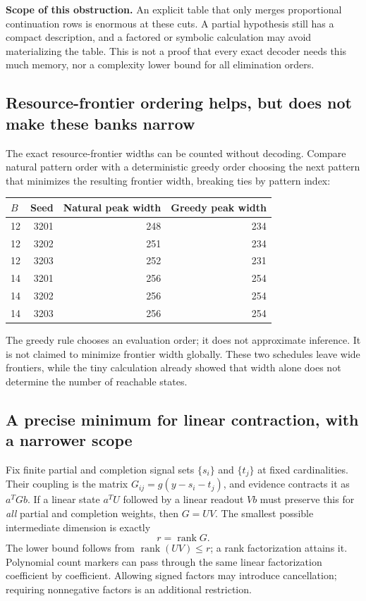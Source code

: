 \documentclass[10pt,a4paper]{article}
\begin{document}
\textbf{Scope of this obstruction.} An explicit table that only merges proportional continuation rows is enormous
at these cuts. A partial hypothesis still has a compact description, and a factored or symbolic calculation may
avoid materializing the table. This is not a proof that every exact decoder needs this much memory, nor a
complexity lower bound for all elimination orders.

\clearpage
\subsection{Resource-frontier ordering helps, but does not make these banks narrow}
The exact resource-frontier widths can be counted without decoding.
Compare natural pattern order with a deterministic greedy order choosing the next pattern that minimizes
the resulting frontier width, breaking ties by pattern index:
\begin{center}
\begin{tabular}{@{}lrrr@{}}\toprule
$B$ & Seed & Natural peak width & Greedy peak width\\\midrule
12 & 3201 & 248 & 234\\
12 & 3202 & 251 & 234\\
12 & 3203 & 252 & 231\\
14 & 3201 & 256 & 254\\
14 & 3202 & 256 & 254\\
14 & 3203 & 256 & 254\\\bottomrule
\end{tabular}
\end{center}
The greedy rule chooses an evaluation order; it does not approximate inference.
It is not claimed to minimize frontier width globally. These two schedules leave wide frontiers, while the
tiny calculation already showed that width alone does not determine the number of reachable states.

\subsection{A precise minimum for linear contraction, with a narrower scope}
Fix finite partial and completion signal sets $\{s_i\}$ and $\{t_j\}$ at fixed cardinalities. Their coupling is
the matrix $G_{ij}=g(y-s_i-t_j)$, and evidence contracts it as $a^TGb$.
If a linear state $a^TU$ followed by a linear readout $Vb$ must preserve this for \emph{all} partial and
completion weights, then $G=UV$. The smallest possible intermediate dimension is exactly
\[
 r=\operatorname{rank}G.
\]
The lower bound follows from $\operatorname{rank}(UV)\leq r$; a rank factorization attains it.
Polynomial count markers can pass through the same linear factorization coefficient by coefficient.
Allowing signed factors may introduce cancellation; requiring nonnegative factors is an additional restriction.
\end{document}
